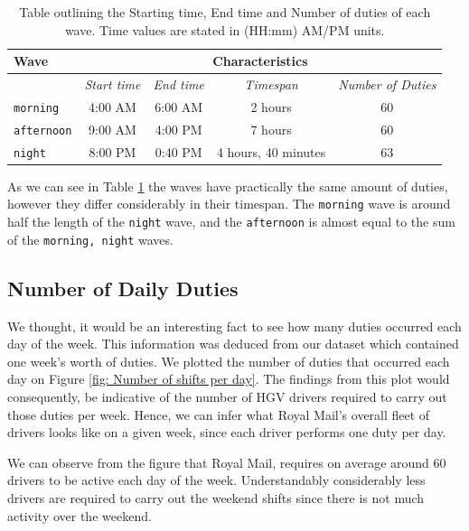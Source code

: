 \begin{table}[ht]
\small
    \centering 
    \begin{tabular}{|l|c|c|c|c|}
        \hline
        \textbf{Wave} & \multicolumn{4}{|c|}{ \textbf{Characteristics}} \\
        \hline
        & \textit{Start time} & \textit{End time} & \textit{Timespan}  & \textit{Number of Duties}  \\
        \hline
        \texttt{morning} & 4:00 AM & 6:00 AM & 2 hours & 60 \\
        \hline
        \texttt{afternoon} & 9:00 AM & 4:00 PM & 7 hours & 60 \\
        \hline
        \texttt{night} & 8:00 PM & 0:40 PM & 4 hours, 40 minutes & 63 \\
        \hline
    \end{tabular}%
    \medbreak
    \caption{Table outlining the Starting time, End time and Number of duties of each wave. Time values are stated in (HH:mm) AM/PM units.}
    \label{table:Starting Waves}
\end{table}

\vspace{\baselineskip}
\noindent
As we can see in Table \ref{table:Starting Waves} the waves have practically the same amount of duties, however they differ considerably in their timespan. The \texttt{morning} wave is around half the length of the \texttt{night} wave, and the \texttt{afternoon} is almost equal to the sum of the \texttt{morning, night} waves.    

\subsection{Number of Daily Duties}
We thought, it would be an interesting fact to see how many duties occurred each day of the week. This information was deduced from our dataset which contained one week's worth of duties. We plotted the number of duties that occurred each day on Figure \ref{fig: Number of shifts per day}. The findings from this plot would consequently, be indicative of the number of HGV drivers required to carry out those duties per week. Hence, we can infer what Royal Mail's overall fleet of drivers looks like on a given week, since each driver performs one duty per day. 

\vspace{\baselineskip}
\noindent
We can observe from the figure that Royal Mail, requires on average around 60 drivers to be active each day of the week. Understandably considerably less drivers are required to carry out the weekend shifts since there is not much activity over the weekend.   

